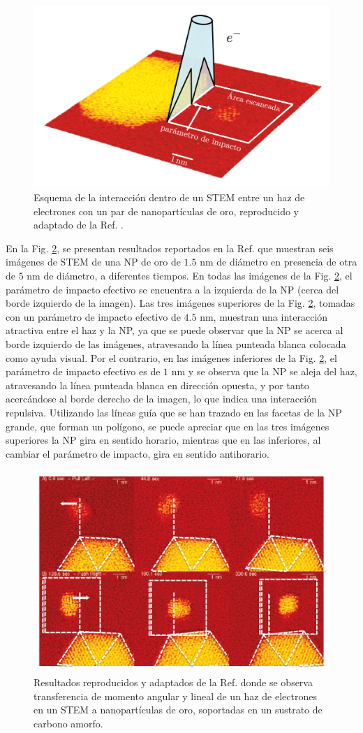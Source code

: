 \begin{figure}[h!]
\centering
\includegraphics[width=0.6\linewidth]{17-imagenes/1-Intro/STEM}
\caption{\label{fig: Batson STEM} Esquema de la interacción dentro de un STEM entre un haz de electrones con un par de nanopartículas de oro, reproducido y adaptado de la Ref. \cite{Batson}.} 
\end{figure}

En la Fig. \ref{fig: Batson momentum transfer}, se presentan resultados reportados en la Ref. \cite{Batson} que muestran seis imágenes de STEM de una NP de oro de $1.5$ nm de diámetro en presencia de otra de $5$ nm de diámetro, a diferentes tiempos. En todas las imágenes de la Fig. \ref{fig: Batson momentum transfer}, el parámetro de impacto efectivo se encuentra a la izquierda de la NP (cerca del borde izquierdo de la imagen). Las tres imágenes superiores de la Fig. \ref{fig: Batson momentum transfer}, tomadas con un parámetro de impacto efectivo de $4.5$ nm, muestran una interacción atractiva entre el haz y la NP, ya que se puede observar que la NP se acerca al borde izquierdo de las imágenes, atravesando la línea punteada blanca colocada como ayuda visual. Por el contrario, en las imágenes inferiores de la Fig. \ref{fig: Batson momentum transfer}, el  parámetro de impacto efectivo es de $1$ nm y  se observa que la NP se aleja del haz, atravesando la línea punteada blanca en dirección opuesta, y por tanto acercándose al borde derecho de la imagen, lo que indica una interacción repulsiva. Utilizando las líneas guía que se han trazado en las facetas de la NP grande, que forman un polígono, se puede apreciar que en las tres imágenes superiores la NP gira en sentido horario, mientras que en las inferiores, al cambiar el parámetro de impacto, gira en sentido antihorario.

\begin{figure}[h!]
\centering
\includegraphics[width=0.6\linewidth]{17-imagenes/1-Intro/Batson}
\caption{\label{fig: Batson momentum transfer} Resultados reproducidos y adaptados de la Ref. \cite{Batson} donde se observa transferencia de momento angular y lineal de un haz de electrones en un STEM a nanopartículas de oro, soportadas en un sustrato de carbono amorfo.} 
\end{figure}

